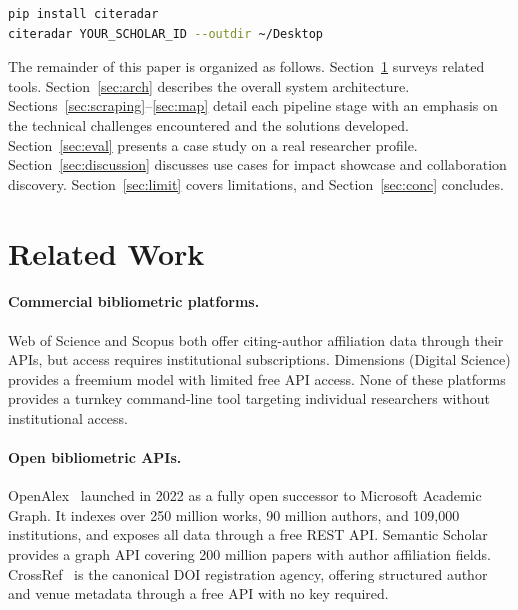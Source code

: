 \documentclass[11pt]{article}
\begin{document}
\begin{lstlisting}[language=bash]
pip install citeradar
citeradar YOUR_SCHOLAR_ID --outdir ~/Desktop
\end{lstlisting}

The remainder of this paper is organized as follows.
Section~\ref{sec:related} surveys related tools.
Section~\ref{sec:arch} describes the overall system architecture.
Sections~\ref{sec:scraping}--\ref{sec:map} detail each pipeline stage with
an emphasis on the technical challenges encountered and the solutions
developed.
Section~\ref{sec:eval} presents a case study on a real researcher profile.
Section~\ref{sec:discussion} discusses use cases for impact showcase and
collaboration discovery.
Section~\ref{sec:limit} covers limitations, and
Section~\ref{sec:conc} concludes.


\section{Related Work}
\label{sec:related}

\paragraph{Commercial bibliometric platforms.}
Web of Science and Scopus both offer citing-author affiliation data through
their APIs, but access requires institutional subscriptions.
Dimensions (Digital Science) provides a freemium model with limited free
API access.
None of these platforms provides a turnkey command-line tool targeting
individual researchers without institutional access.

\paragraph{Open bibliometric APIs.}
OpenAlex~\cite{priem2022openalex} launched in 2022 as a fully open successor
to Microsoft Academic Graph.
It indexes over 250 million works, 90 million authors, and 109,000
institutions, and exposes all data through a free REST API.
Semantic Scholar~\cite{lo2020s2orc} provides a graph API covering
200 million papers with author affiliation fields.
CrossRef~\cite{crossref} is the canonical DOI registration agency, offering
structured author and venue metadata through a free API with no key required.
\end{document}
